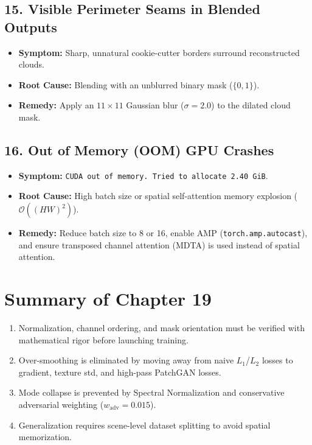 \subsection{15. Visible Perimeter Seams in Blended Outputs}
\begin{itemize}
    \item \textbf{Symptom:} Sharp, unnatural cookie-cutter borders surround reconstructed clouds.
    \item \textbf{Root Cause:} Blending with an unblurred binary mask ($\{0, 1\}$).
    \item \textbf{Remedy:} Apply an $11 \times 11$ Gaussian blur ($\sigma=2.0$) to the dilated cloud mask.
\end{itemize}

\subsection{16. Out of Memory (OOM) GPU Crashes}
\begin{itemize}
    \item \textbf{Symptom:} \texttt{CUDA out of memory. Tried to allocate 2.40 GiB}.
    \item \textbf{Root Cause:} High batch size or spatial self-attention memory explosion ($\mathcal{O}((HW)^2)$).
    \item \textbf{Remedy:} Reduce batch size to 8 or 16, enable AMP (\texttt{torch.amp.autocast}), and ensure transposed channel attention (MDTA) is used instead of spatial attention.
\end{itemize}

\section{Summary of Chapter 19}
\begin{enumerate}
    \item Normalization, channel ordering, and mask orientation must be verified with mathematical rigor before launching training.
    \item Over-smoothing is eliminated by moving away from naive $L_1$/$L_2$ losses to gradient, texture std, and high-pass PatchGAN losses.
    \item Mode collapse is prevented by Spectral Normalization and conservative adversarial weighting ($w_{\text{adv}} = 0.015$).
    \item Generalization requires scene-level dataset splitting to avoid spatial memorization.
\end{enumerate}

